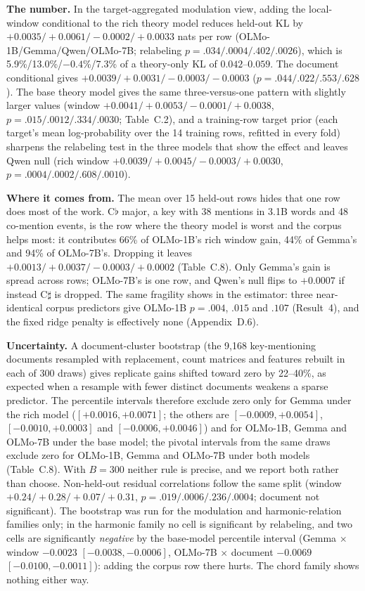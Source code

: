 \documentclass[11pt]{article}
\newcommand{\fl}{$\flat$}
\newcommand{\sh}{$\sharp$}
\begin{document}
\begin{resultbox}
\textbf{The number.} In the target-aggregated modulation view, adding the local-window conditional to the rich theory model reduces held-out KL by $+0.0035/{+}0.0061/{-}0.0002/{+}0.0033$ nats per row (OLMo-1B/Gemma/Qwen/OLMo-7B; relabeling $p=.034/.0004/.402/.0026$), which is 5.9\%/13.0\%/$-0.4$\%/7.3\% of a theory-only KL of $0.042$--$0.059$. The document conditional gives $+0.0039/{+}0.0031/{-}0.0003/{-}0.0003$ ($p=.044/.022/.553/.628$). The base theory model gives the same three-versus-one pattern with slightly larger values (window $+0.0041/{+}0.0053/{-}0.0001/{+}0.0038$, $p=.015/.0012/.334/.0030$; Table~C.2), and a training-row target prior (each target's mean log-probability over the 14 training rows, refitted in every fold) sharpens the relabeling test in the three models that show the effect and leaves Qwen null (rich window $+0.0039/{+}0.0045/{-}0.0003/{+}0.0030$, $p=.0004/.0002/.608/.0010$).

\textbf{Where it comes from.} The mean over 15 held-out rows hides that one row does most of the work. C\fl{} major, a key with 38 mentions in 3.1B words and 48 co-mention events, is the row where the theory model is worst and the corpus helps most: it contributes 66\% of OLMo-1B's rich window gain, 44\% of Gemma's and 94\% of OLMo-7B's. Dropping it leaves $+0.0013/{+}0.0037/{-}0.0003/{+}0.0002$ (Table~C.8). Only Gemma's gain is spread across rows; OLMo-7B's is one row, and Qwen's null flips to $+0.0007$ if instead C\sh{} is dropped. The same fragility shows in the estimator: three near-identical corpus predictors give OLMo-1B $p=.004$, $.015$ and $.107$ (Result~4), and the fixed ridge penalty is effectively none (Appendix~D.6).

\textbf{Uncertainty.} A document-cluster bootstrap (the 9,168 key-mentioning documents resampled with replacement, count matrices and features rebuilt in each of 300 draws) gives replicate gains shifted toward zero by 22--40\%, as expected when a resample with fewer distinct documents weakens a sparse predictor. The percentile intervals therefore exclude zero only for Gemma under the rich model ($[+0.0016,+0.0071]$; the others are $[-0.0009,+0.0054]$, $[-0.0010,+0.0003]$ and $[-0.0006,+0.0046]$) and for OLMo-1B, Gemma and OLMo-7B under the base model; the pivotal intervals from the same draws exclude zero for OLMo-1B, Gemma and OLMo-7B under both models (Table~C.8). With $B=300$ neither rule is precise, and we report both rather than choose. Non-held-out residual correlations follow the same split (window $+0.24/{+}0.28/{+}0.07/{+}0.31$, $p=.019/.0006/.236/.0004$; document not significant). The bootstrap was run for the modulation and harmonic-relation families only; in the harmonic family no cell is significant by relabeling, and two cells are significantly \emph{negative} by the base-model percentile interval (Gemma $\times$ window $-0.0023$ $[-0.0038,-0.0006]$, OLMo-7B $\times$ document $-0.0069$ $[-0.0100,-0.0011]$): adding the corpus row there hurts. The chord family shows nothing either way.


\end{resultbox}
\end{document}
